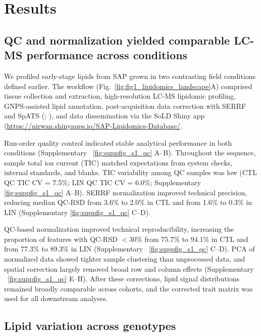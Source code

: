 \documentclass[9pt,twocolumn,twoside]{rilabRxiv}
\begin{document}

\section{Results}

\subsection*{QC and normalization yielded comparable LC-MS performance across conditions}

We profiled early-stage lipids from SAP grown in two contrasting field conditions defined earlier. The workflow (Fig.~\ref{fig:fig1_lipidomics_landscape}A) comprised tissue collection and extraction, high-resolution LC-MS lipidomic profiling, GNPS-assisted lipid annotation, post-acquisition data correction with SERRF and SpATS (\cite{Fan2019}; \cite{RodriguezAlvarez2018}), and data dissemination via the SoLD Shiny app (\url{https://nirwan.shinyapps.io/SAP-Lipidomics-Database/}.

Run-order quality control indicated stable analytical performance in both conditions (Supplementary ~\ref{fig:suppfig_s1_qc} A--B). Throughout the sequence, sample total ion current (TIC) matched expectations from system checks, internal standards, and blanks. TIC variability among QC samples was low (CTL QC TIC CV = 7.5\%; LIN QC TIC CV = 6.0\%; Supplementary \ref{fig:suppfig_s1_qc} A--B). SERRF normalization improved technical precision, reducing median QC-RSD from 3.6\% to 2.0\% in CTL and from 1.6\% to 0.3\% in LIN (Supplementary \ref{fig:suppfig_s1_qc} C--D). 

QC-based normalization improved technical reproducibility, increasing the proportion of features with QC-RSD $<30\%$ from 75.7\% to 94.1\% in CTL and from 77.3\% to 89.3\% in LIN (Supplementary ~\ref{fig:suppfig_s1_qc} C--D). PCA of normalized data showed tighter sample clustering than unprocessed data, and spatial correction largely removed broad row and column effects (Supplementary ~\ref{fig:suppfig_s1_qc} E--H). After these corrections, lipid signal distributions remained broadly comparable across cohorts, and the corrected trait matrix was used for all downstream analyses.


\subsection*{Lipid variation across genotypes}
\end{document}
